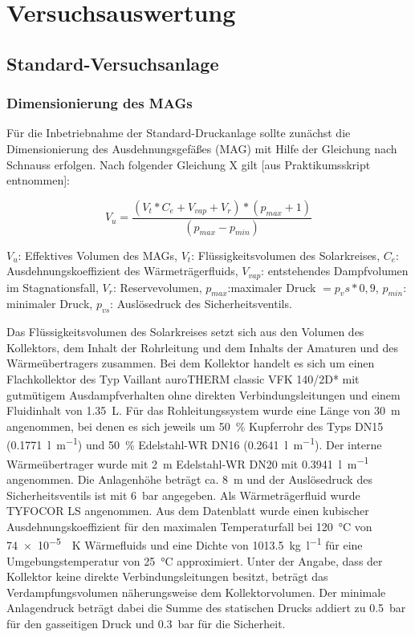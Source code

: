 \section{Versuchsauswertung}

\subsection{Standard-Versuchsanlage} 

\subsubsection{Dimensionierung des MAGs}
Für die Inbetriebnahme der Standard-Druckanlage sollte zunächst die Dimensionierung des Ausdehnungsgefäßes (MAG) mit Hilfe der Gleichung nach Schnauss erfolgen.  Nach folgender Gleichung X gilt [aus Praktikumsskript entnommen]: 

\begin{equation}
\label{eq:eff.VolMAG}
V_u= \frac{(V_t * C_e + V_{vap} + V_r)*(p_{max} + 1)}{(p_{max}-p_{min})}
\end{equation}

\begin{center}
	\begin{small}
		$V_u$: Effektives Volumen des MAGs,
		$V_t$: Flüssigkeitsvolumen des Solarkreises,
		$C_e$: Ausdehnungskoeffizient des Wärmeträgerfluids,
		$V_{vap}$: entstehendes Dampfvolumen im Stagnationsfall,
		$V_r$: Reservevolumen,
		$p_{max}$:maximaler Druck $=p_vs*0,9$,
		$p_{min}$: minimaler Druck,
		$p_{vs}$: Auslösedruck des Sicherheitsventils.
	\end{small}
\end{center}

Das Flüssigkeitsvolumen des Solarkreises setzt sich aus den Volumen des Kollektors, dem Inhalt der Rohrleitung und dem Inhalts der Amaturen und des Wärmeübertragers zusammen. Bei dem Kollektor handelt es sich um einen Flachkollektor des Typ Vaillant auroTHERM classic VFK 140/2D* mit gutmütigem Ausdampfverhalten ohne direkten Verbindungsleitungen und einem Fluidinhalt von \SI{1,35}{\liter}. Für das Rohleitungssystem wurde eine Länge von \SI{30}{\metre} angenommen, bei denen es sich jeweils um \SI{50}{\percent} Kupferrohr des Typs DN15 (\SI{0,1771}{\litre\per\metre}) und \SI{50}{\percent} Edelstahl-WR DN16 (\SI{0,2641}{\litre\per\metre}). Der interne Wärmeübertrager wurde mit \SI{2}{\metre} Edelstahl-WR DN20 mit \SI{0,3941}{\litre\per\metre} angenommen. Die Anlagenhöhe beträgt ca. \SI{8}{\metre} und der Auslösedruck des Sicherheitsventils ist mit \SI{6}{\bar} angegeben. Als Wärmeträgerfluid wurde TYFOCOR LS angenommen. Aus dem Datenblatt wurde einen kubischer Ausdehnungskoeffizient für den maximalen Temperaturfall bei \SI{120}{\celsius} von \SI{74e-5}{\per\kelvin} Wärmefluids und eine Dichte von \SI{1013,5}{\kg\per\litre} für eine Umgebungstemperatur von \SI{25}{\celsius} approximiert. Unter der Angabe, dass der Kollektor keine direkte Verbindungsleitungen besitzt, beträgt das Verdampfungsvolumen näherungsweise dem Kollektorvolumen. Der minimale Anlagendruck beträgt dabei die Summe des statischen Drucks addiert zu \SI{0,5}{\bar} für den gasseitigen Druck und \SI{0,3}{\bar} für die Sicherheit. 

